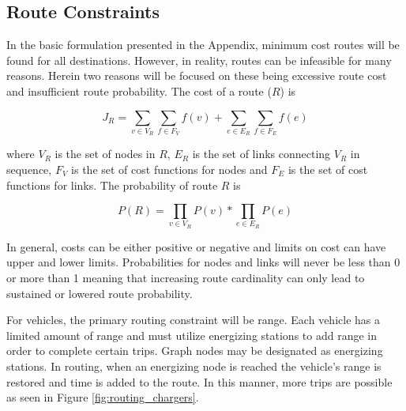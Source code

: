 \documentclass[12pt]{article}
\begin{document}
\subsection*{Route Constraints}

In the basic formulation presented in the Appendix, minimum cost routes will be found for all destinations. However, in reality, routes can be infeasible for many reasons. Herein two reasons will be focused on these being excessive route cost and insufficient route probability. The cost of a route ($R$) is

\begin{equation}
	J_R = \sum_{v\in V_R}\sum_{f\in F_V} f(v) + \sum_{e\in E_R}\sum_{f\in F_E} f(e)
\end{equation}

where $V_R$ is the set of nodes in $R$, $E_R$ is the set of links connecting $V_R$ in sequence, $F_V$ is the set of cost functions for nodes and $F_E$ is the set of cost functions for links. The probability of route $R$ is

\begin{equation}
	P(R) = \prod_{v\in V_R}P(v) * \prod_{e\in E_R}P(e)
\end{equation}

In general, costs can be either positive or negative and limits on cost can have upper and lower limits. Probabilities for nodes and links will never be less than 0 or more than 1 meaning that increasing route cardinality can only lead to sustained or lowered route probability.

For vehicles, the primary routing constraint will be range. Each vehicle has a limited amount of range and must utilize energizing stations to add range in order to complete certain trips. Graph nodes may be designated as energizing stations. In routing, when an energizing node is reached the vehicle's range is restored and time is added to the route. In this manner, more trips are possible as seen in Figure \ref{fig:routing_chargers}.
\end{document}
